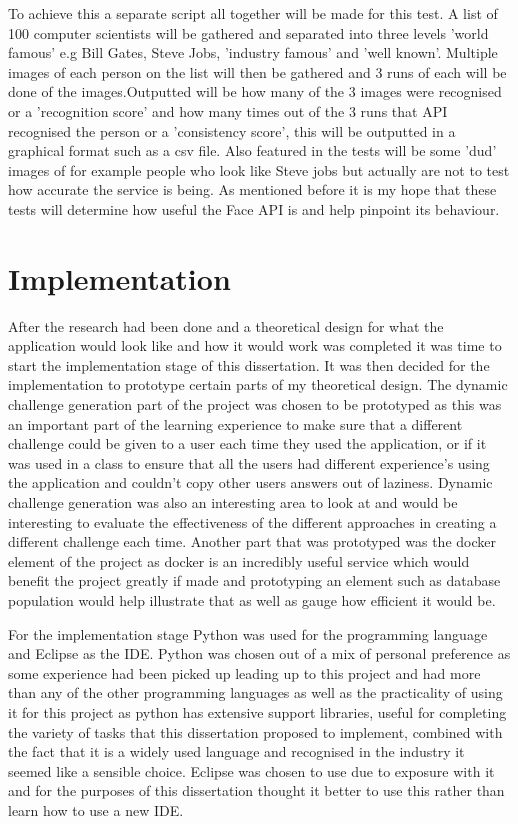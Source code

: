 \documentclass[12pt,a4paper]{article}
\begin{document}
To achieve this a separate script all together will be made for this test. A list of 100 computer scientists will be gathered and separated into three levels 'world famous' e.g Bill Gates, Steve Jobs, 'industry famous' and 'well known'. Multiple images of each person on the list will then be gathered and 3 runs of each will be done of the images.Outputted will be how many of the 3 images were recognised or a 'recognition score' and how many times out of the 3 runs that API recognised the person or a 'consistency score', this will be outputted in a graphical format such as a csv file. Also featured in the tests will be  some 'dud' images of for example people who look like Steve jobs but actually are not to test how accurate the service is being. As mentioned before it is my hope that these tests will determine how useful the Face API is and help pinpoint its behaviour. 

\newpage
\section{Implementation}
After the research had been done and a theoretical design for what the application would look like and how it would work was completed it was time to start the implementation stage of this dissertation. It was then decided for the implementation to prototype certain parts of my theoretical design. The dynamic challenge generation part of the project was chosen to be prototyped as this was an important part of the learning experience to make sure that a different challenge could be given to a user each time they used the application, or if it was used in a class to ensure that all the users had different experience's using the application and couldn't copy other users answers out of laziness. Dynamic challenge generation was also an interesting area to look at and would be interesting to evaluate the effectiveness of the different approaches in creating a different challenge each time. Another part that was prototyped was the docker element of the project as docker is an incredibly useful service which would benefit the project greatly if made and prototyping an element such as database population would help illustrate that as well as gauge how efficient it would be.  

For the implementation stage Python was used for the programming language and Eclipse as the IDE. Python was chosen out of a mix of personal preference as some experience had been picked up leading up to this project and had more than any of the other programming languages as well as the practicality of using it for this project as python has extensive support libraries, useful for completing the variety of tasks that this dissertation proposed to implement, combined with the fact that it is a widely used language and recognised in the industry it seemed like a sensible choice. Eclipse was chosen to use due to exposure with it and for the purposes of this dissertation thought it better to use this rather than learn how to use a new IDE.
\end{document}
